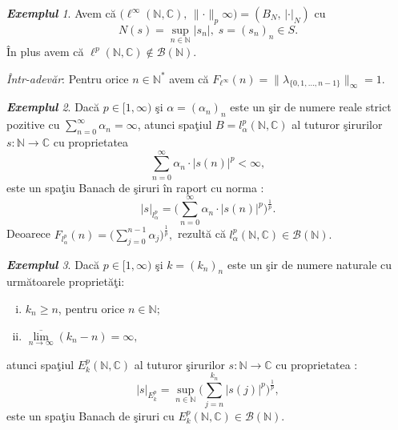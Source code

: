 \documentclass[ a4paper, 12pt]{report}
\theoremstyle{definition}
\theoremstyle{remark}
\newtheorem{exemple}{\bf Exemplul}[section]
\numberwithin{equation}{section}
\begin{document}
\begin{exemple}
Avem c\u a $\big(\ell^\infty(\mathbb{N},\mathbb{C}), \, \lVert \cdot \rVert_p\infty) = (B_N, \, \lvert\cdot \rvert_N)$ cu
$$N(s)=\sup\limits_{n \in \mathbb{N}}\lvert s_n \rvert, \; s = (s_n)_n \in S.$$
\^ In plus avem c\u a $\ell^p(\mathbb{N},\mathbb{C}) \notin \mathcal{B}(\mathbb{N})$.
\end{exemple}

{\it \^ Intr-adev\u ar}: Pentru orice $n \in \mathbb{N}^*$ avem c\u a $F_{\ell^\infty}(n) = \lVert \lambda_{\{ 0, 1, \ldots, n - 1\}}\rVert_\infty = 1$.

\begin{exemple}
Dac\u a $p \in [1,\infty)$ \c si $\alpha = (\alpha_{n})_n$ este un \c sir de numere reale strict pozitive cu $\sum\limits_{n=0}^{\infty} \alpha_n = \infty$, atunci spa\c tiul $B = l_\alpha^p(\mathbb{N},\mathbb{C})$ al tuturor \c sirurilor $s : \mathbb{N} \rightarrow \mathbb{C}$ cu proprietatea
$$\sum\limits_{n=0}^{\infty} \alpha_n \cdot \lvert s(n) \rvert^p < \infty,$$ este un spa\c tiu Banach de \c siruri \^in raport cu norma :
\[ \lvert s \rvert_{l_{\alpha}^{p}} = \Big(\sum\limits_{n=0}^{\infty} \alpha_n \cdot \lvert s(n) \rvert^p\Big)^{\frac{1}{p}}.\]
Deoarece $F_{l_{\alpha}^{p}}(n) = \Big(\sum\limits_{j=0}^{n-1} \alpha_j\Big)^{\frac{1}{p}} ,$
rezult\u a c\u a $l_{\alpha}^{p}(\mathbb{N},\mathbb{C}) \in \mathcal{B}(\mathbb{N}).$
\end{exemple}
\begin{exemple}
Dac\u a $p\in [1,\infty)$ \c si $k = (k_n)_n$ este un \c sir de numere naturale cu urm\u atoarele propriet\u a\c ti:
\begin{enumerate}[(i)]
\item $k_n \geq n$, pentru orice $n \in \mathbb{N};$
\item $\overline{\lim\limits_{n \rightarrow \infty}}(k_n - n) = \infty,$
\end{enumerate} atunci spa\c tiul $E_{k}^{p}(\mathbb{N},\mathbb{C})$ al tuturor \c sirurilor $s : \mathbb{N} \rightarrow \mathbb{C}$ cu proprietatea :
\[ \lvert s \rvert_{E_{k}^{p}} = \sup\limits_{n \in \mathbb{N}}\Big(\sum\limits_{j=n}^{k_n}\lvert s(j) \rvert^{p}\Big)^{\frac{1}{p}},\] este un spa\c tiu Banach de \c siruri cu $E_{k}^{p}(\mathbb{N},\mathbb{C}) \in \mathcal{B}(\mathbb{N}).$
\end{exemple}
\end{document}
